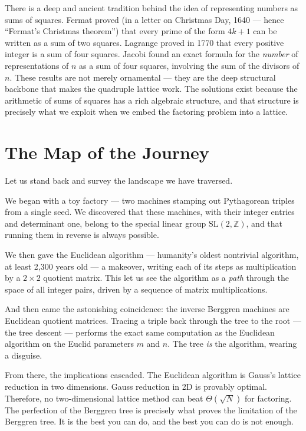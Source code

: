 There is a deep and ancient tradition behind the idea of representing numbers as sums of squares. Fermat proved (in a letter on Christmas Day, 1640 --- hence ``Fermat's Christmas theorem'') that every prime of the form \(4k + 1\) can be written as a sum of two squares. Lagrange proved in 1770 that every positive integer is a sum of four squares. Jacobi found an exact formula for the \emph{number} of representations of \(n\) as a sum of four squares, involving the sum of the divisors of \(n\). These results are not merely ornamental --- they are the deep structural backbone that makes the quadruple lattice work. The solutions exist because the arithmetic of sums of squares has a rich algebraic structure, and that structure is precisely what we exploit when we embed the factoring problem into a lattice.



\section{The Map of the Journey}\label{ch2-the-map-of-the-journey}

Let us stand back and survey the landscape we have traversed.

We began with a toy factory --- two machines stamping out Pythagorean triples from a single seed. We discovered that these machines, with their integer entries and determinant one, belong to the special linear group \(\mathrm{SL}(2, \mathbb{Z})\), and that running them in reverse is always possible.

We then gave the Euclidean algorithm --- humanity's oldest nontrivial algorithm, at least 2,300 years old --- a makeover, writing each of its steps as multiplication by a \(2 \times 2\) quotient matrix. This let us see the algorithm as a \emph{path} through the space of all integer pairs, driven by a sequence of matrix multiplications.

And then came the astonishing coincidence: the inverse Berggren machines are Euclidean quotient matrices. Tracing a triple back through the tree to the root --- the tree descent --- performs the exact same computation as the Euclidean algorithm on the Euclid parameters \(m\) and \(n\). The tree \emph{is} the algorithm, wearing a disguise.

From there, the implications cascaded. The Euclidean algorithm is Gauss's lattice reduction in two dimensions. Gauss reduction in 2D is provably optimal. Therefore, no two-dimensional lattice method can beat \(\Theta(\sqrt{N})\) for factoring. The perfection of the Berggren tree is precisely what proves the limitation of the Berggren tree. It is the best you can do, and the best you can do is not enough.

